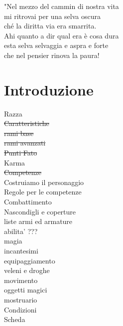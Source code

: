 \documentclass[12pt,a4paper,twoside,openany]{book}
\begin{document}

\pagebreak

\setcounter{page}{1}

\begin{multicols}{2}
\tableofcontents{}

\end{multicols}

\vfill

\begin{changemargin}{0.3cm}{0.3cm}\begin{tcolorbox}
"Nel mezzo del cammin di nostra vita\\
mi ritrovai per una selva oscura\\
ché la diritta via era smarrita.\\
Ahi quanto a dir qual era è cosa dura\\
esta selva selvaggia e aspra e forte\\
che nel pensier rinova la paura!\\
\end{tcolorbox}\end{changemargin}

\pagebreak

\section{Introduzione}
Razza\\
\sout{Caratteristiche}\\
\sout{rami base}\\
\sout{rami avanzati}\\
\sout{Punti Fato}\\
Karma\\
\sout{Competenze}\\
Costruiamo il personaggio\\
Regole per le competenze\\
Combattimento\\
Nascondigli e coperture\\
liste armi ed armature\\
abilita' ???\\
magia\\
incantesimi\\
equipaggiamento\\
veleni e droghe\\
movimento\\
oggetti magici\\
mostruario\\
Condizioni\\
Scheda\\
\end{document}
